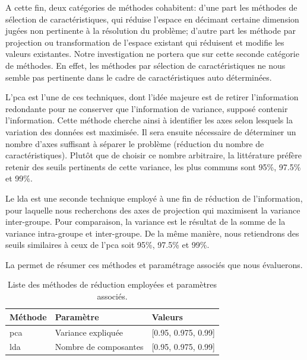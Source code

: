 A cette fin, deux catégories de méthodes cohabitent: d'une part les méthodes de sélection de caractéristiques, qui réduise l'espace en décimant certaine dimension jugées non pertinente à la résolution du problème; d'autre part les méthode par projection ou transformation de l'espace existant qui réduisent et modifie les valeurs existantes. Notre investigation ne portera que sur cette seconde catégorie de méthodes. En effet, les méthodes par sélection de caractéristiques ne nous semble pas pertinente dans le cadre de caractéristiques auto déterminées.\par

L'\gls{pca} est l'une de ces techniques, dont l'idée majeure est de retirer l'information redondante pour ne conserver que l'information de variance, supposé contenir l'information. Cette méthode cherche ainsi à identifier les axes selon lesquels la variation des données est maximisée. Il sera ensuite nécessaire de déterminer un nombre d'axes suffisant à séparer le problème (réduction du nombre de caractéristiques). Plutôt que de choisir ce nombre arbitraire, la littérature préfère retenir des seuils pertinents de cette variance, les plus communs sont 95\%, 97.5\% et 99\%.\par

Le \gls{lda} est une seconde technique employé à une fin de réduction de l'information, pour laquelle nous recherchons des axes de projection qui maximisent la variance inter-groupe. Pour comparaison, la variance est le résultat de la somme de la variance intra-groupe et inter-groupe. De la même manière, nous retiendrons des seuils similaires à ceux de l'\gls{pca} soit 95\%, 97.5\% et 99\%.\par

La  permet de résumer ces méthodes et paramétrage associés que nous évaluerons.\par 

\begin{table}[H]
    \centering
    \begin{tabular*}{0.6\linewidth}{lll}
    \toprule
    \textbf{Méthode}       & \textbf{Paramètre}        &   \textbf{Valeurs}     \\ \midrule
    \gls{pca}              & Variance expliquée        &   [0.95, 0.975, 0.99]  \\ \cmidrule{2-3}
    \gls{lda}              & Nombre de composantes     &   [0.95, 0.975, 0.99]  \\ \hline
    \bottomrule
    \end{tabular*}
    \caption{Liste des méthodes de réduction employées et paramètres associés.}
    \label{tab:summary_reduction_methods}
\end{table}\par

